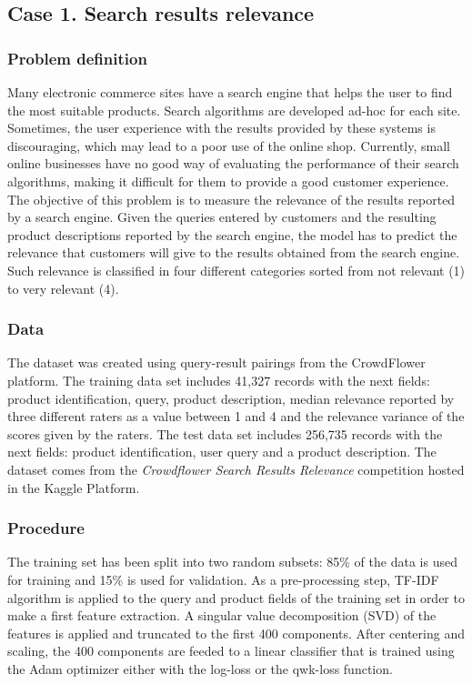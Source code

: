 \documentclass[times,twocolumn,final,authoryear]{elsarticle}
\begin{document}
\subsection{Case 1. Search results relevance}

\subsubsection{Problem definition}

Many electronic commerce sites have a search engine that helps the user to find the most suitable products. Search algorithms are developed ad-hoc for each site. Sometimes, the user experience with the results provided by these systems is discouraging, which may lead to a poor use of the online shop. Currently, small online businesses have no good way of evaluating the performance of their search algorithms, making it difficult for them to provide a good customer experience. The objective of this problem is to measure the relevance of the results reported by a search engine. Given the queries entered by customers and the resulting product descriptions reported by the search engine, the model has to predict the relevance that customers will give to the results obtained from the search engine. Such relevance is classified in four different categories sorted from not relevant (1) to very relevant (4).

\subsubsection{Data}

The dataset was created using query-result pairings from the CrowdFlower platform. The training data set includes 41,327 records with the next fields: product identification, query, product description, median relevance reported by three different raters as a value between 1 and 4 and the relevance variance of the scores given by the raters. The test data set includes 256,735 records with the next fields: product identification, user query and a product description. The dataset comes from the \textit{Crowdflower Search Results Relevance} competition hosted in the Kaggle Platform.

\subsubsection{Procedure}

The training set has been split into two random subsets: 85\% of the data is used for training and 15\% is used for validation. As a pre-processing step, TF-IDF algorithm \citep{Ramos2003UsingTT} is applied to the query and product fields of the training set in order to make a first feature extraction. A singular value decomposition (SVD) of the features is applied and truncated to the first 400 components. After centering and scaling, the 400 components are feeded to a linear classifier that is trained using the Adam optimizer \citep{DBLP:journals/corr/KingmaB14} either with the log-loss or the qwk-loss function. 
		
\end{document}
